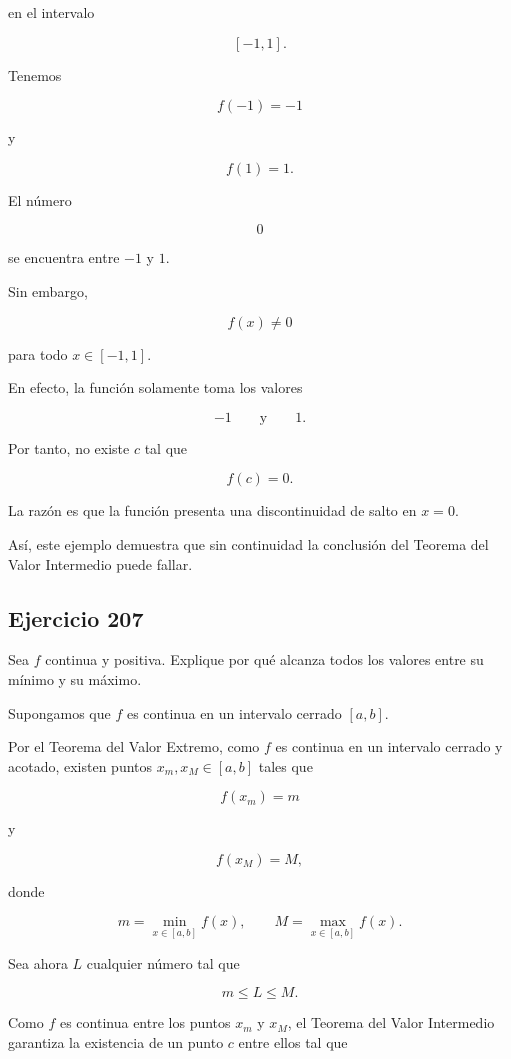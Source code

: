 \documentclass[12pt]{article}
\begin{document}
en el intervalo

\[
[-1,1].
\]

Tenemos

\[
f(-1)=-1
\]

y

\[
f(1)=1.
\]

El número

\[
0
\]

se encuentra entre \(-1\) y \(1\).

Sin embargo,

\[
f(x)\neq0
\]

para todo \(x\in[-1,1]\).

En efecto, la función solamente toma los valores

\[
-1
\qquad\text{y}\qquad
1.
\]

Por tanto, no existe \(c\) tal que

\[
f(c)=0.
\]

La razón es que la función presenta una discontinuidad de salto en
\(x=0\).

Así, este ejemplo demuestra que sin continuidad la conclusión del
Teorema del Valor Intermedio puede fallar.

\subsection*{Ejercicio 207}

Sea \(f\) continua y positiva. Explique por qué alcanza todos los
valores entre su mínimo y su máximo.

Supongamos que \(f\) es continua en un intervalo cerrado \([a,b]\).

Por el Teorema del Valor Extremo, como \(f\) es continua en un intervalo
cerrado y acotado, existen puntos \(x_m,x_M\in[a,b]\) tales que

\[
f(x_m)=m
\]

y

\[
f(x_M)=M,
\]

donde

\[
m=\min_{x\in[a,b]}f(x),
\qquad
M=\max_{x\in[a,b]}f(x).
\]

Sea ahora \(L\) cualquier número tal que

\[
m\leq L\leq M.
\]

Como \(f\) es continua entre los puntos \(x_m\) y \(x_M\), el Teorema
del Valor Intermedio garantiza la existencia de un punto \(c\) entre
ellos tal que
\end{document}
